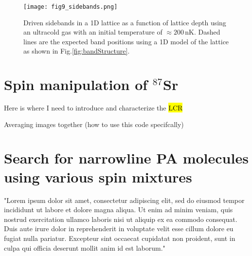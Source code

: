 	\begin{figure}
		\texttt{[image: fig9\_sidebands.png]}
		\caption{Driven sidebands in a 1D lattice as a function of lattice depth using an ultracold gas with an initial temperature of $\approx 200\,$nK. Dashed lines are the expected band positions using a 1D model of the lattice as shown in Fig.\;\ref{fig:bandStructure}.}
		\label{fig:oneColorSB}
	\end{figure} 

\section{Spin manipulation of $^{87}$Sr}
\label{sec:spin_pol}

Here is where I need to introduce and characterize the \hl{LCR}

Averaging images together (how to use this code specifcally)

\section{Search for narrowline PA molecules using various spin mixtures}
\label{sec:87PAS}

"Lorem ipsum dolor sit amet, consectetur adipiscing elit, sed do eiusmod tempor incididunt ut labore et dolore magna aliqua. Ut enim ad minim veniam, quis nostrud exercitation ullamco laboris nisi ut aliquip ex ea commodo consequat. Duis aute irure dolor in reprehenderit in voluptate velit esse cillum dolore eu fugiat nulla pariatur. Excepteur sint occaecat cupidatat non proident, sunt in culpa qui officia deserunt mollit anim id est laborum."